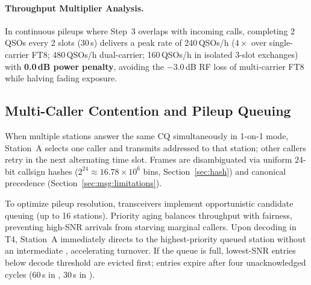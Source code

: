 \paragraph{Throughput Multiplier Analysis.}
In continuous pileups where Step~3 overlaps with incoming calls, completing 2 QSOs every 2 slots (30\,s) delivers a peak rate of 240\,QSOs/h ($4\times$ over single-carrier FT8; 480\,QSOs/h dual-carrier; 160\,QSOs/h in isolated 3-slot exchanges) with \textbf{0.0\,dB power penalty}, avoiding the $-3.0$\,dB RF loss of multi-carrier FT8 while halving fading exposure.

\subsection{Multi-Caller Contention and Pileup Queuing}
\label{sec:qso:contention}

When multiple stations answer the same CQ simultaneously in 1-on-1 mode, Station~A selects one caller and transmits  addressed to that station; other callers retry in the next alternating time slot. Frames are disambiguated via uniform 24-bit callsign hashes ($2^{24} \approx 16.78\times 10^6$ bins, Section~\ref{sec:hash}) and canonical precedence (\mbox{Section~\ref{sec:msg:limitations}}).

To optimize pileup resolution, transceivers implement opportunistic candidate queuing (up to 16 stations). Priority aging balances throughput with fairness, preventing high-SNR arrivals from starving marginal callers. Upon decoding  in T4, Station~A immediately directs  to the highest-priority queued station without an intermediate , accelerating turnover. If the queue is full, lowest-SNR entries below decode threshold are evicted first; entries expire after four unacknowledged cycles (60\,s in , 30\,s in ).

\pagebreak
